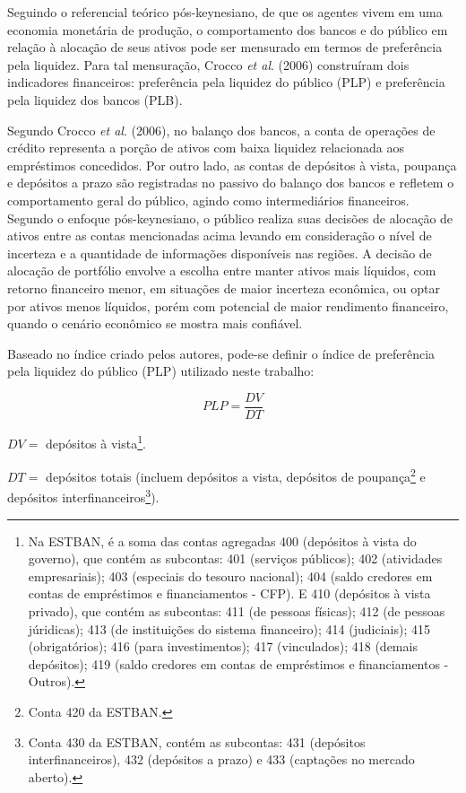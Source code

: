 \documentclass[a4paper,12pt]{article}
\begin{document}
Seguindo o referencial teórico pós-keynesiano, de que os agentes vivem
em uma economia monetária de produção, o comportamento dos bancos e do
público em relação à alocação de seus ativos pode ser mensurado em
termos de preferência pela liquidez. Para tal mensuração, Crocco
\emph{et al}. (2006) construíram dois indicadores financeiros:
preferência pela liquidez do público (PLP) e preferência pela liquidez
dos bancos (PLB).

Segundo Crocco \emph{et al}. (2006), no balanço dos bancos, a conta de
operações de crédito representa a porção de ativos com baixa liquidez
relacionada aos empréstimos concedidos. Por outro lado, as contas de
depósitos à vista, poupança e depósitos a prazo são registradas no
passivo do balanço dos bancos e refletem o comportamento geral do
público, agindo como intermediários financeiros. Segundo o enfoque
pós-keynesiano, o público realiza suas decisões de alocação de ativos
entre as contas mencionadas acima levando em consideração o nível de
incerteza e a quantidade de informações disponíveis nas regiões. A
decisão de alocação de portfólio envolve a escolha entre manter ativos
mais líquidos, com retorno financeiro menor, em situações de maior
incerteza econômica, ou optar por ativos menos líquidos, porém com
potencial de maior rendimento financeiro, quando o cenário econômico se
mostra mais confiável.

Baseado no índice criado pelos autores, pode-se definir o índice de
preferência pela liquidez do público (PLP) utilizado neste trabalho:

\begin{equation}
PLP = \frac{DV}{DT}
\end{equation}

\(DV =\) depósitos à vista\footnote{Na ESTBAN, é a soma das contas
  agregadas 400 (depósitos à vista do governo), que contém as subcontas:
  401 (serviços públicos); 402 (atividades empresariais); 403 (especiais
  do tesouro nacional); 404 (saldo credores em contas de empréstimos e
  financiamentos - CFP). E 410 (depósitos à vista privado), que contém
  as subcontas: 411 (de pessoas físicas); 412 (de pessoas júridicas);
  413 (de instituições do sistema financeiro); 414 (judiciais); 415
  (obrigatórios); 416 (para investimentos); 417 (vinculados); 418
  (demais depósitos); 419 (saldo credores em contas de empréstimos e
  financiamentos - Outros).}.

\(DT =\) depósitos totais (incluem depósitos a vista, depósitos de
poupança\footnote{Conta 420 da ESTBAN.} e depósitos
interfinanceiros\footnote{Conta 430 da ESTBAN, contém as subcontas: 431
  (depósitos interfinanceiros), 432 (depósitos a prazo) e 433 (captações
  no mercado aberto).}).
\end{document}
